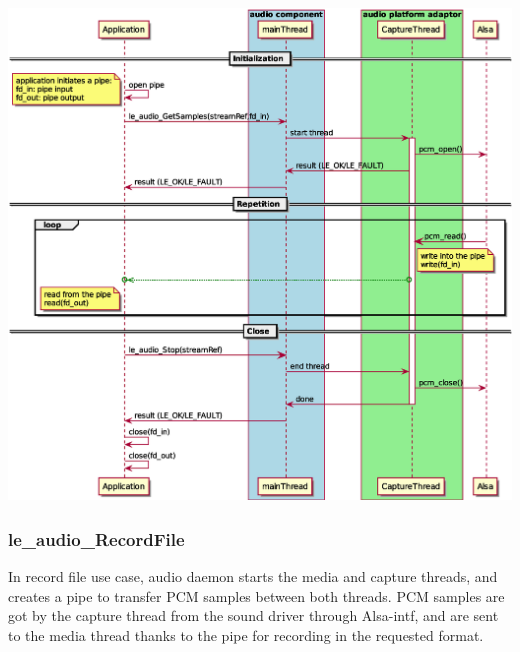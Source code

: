 \begin{DoxyImageNoCaption}
  \mbox{\includegraphics[width=\textwidth,height=\textheight/2,keepaspectratio=true]{le_audio_GetSamples}}
\end{DoxyImageNoCaption}
\hypertarget{c_SDD_audio_le_audio_RecordFile}{}\subsubsection{le\+\_\+audio\+\_\+\+Record\+File}\label{c_SDD_audio_le_audio_RecordFile}
In record file use case, audio daemon starts the media and capture threads, and creates a pipe to transfer P\+CM samples between both threads. P\+CM samples are got by the capture thread from the sound driver through Alsa-\/intf, and are sent to the media thread thanks to the pipe for recording in the requested format.


